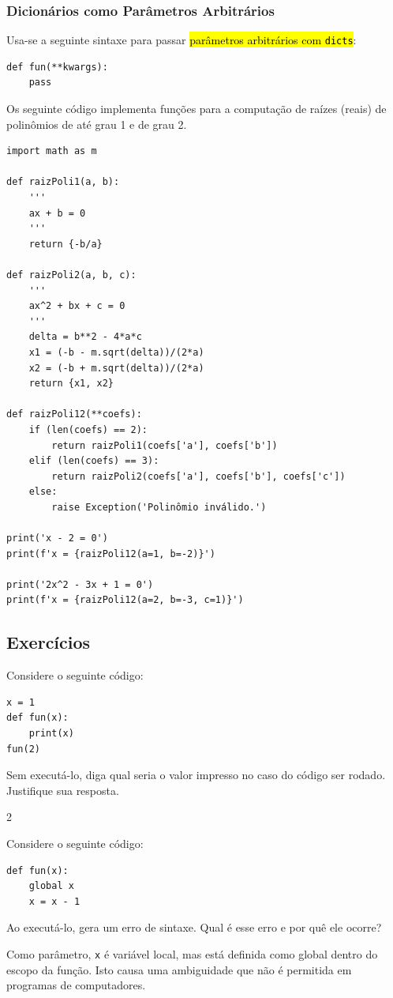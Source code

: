 \subsubsection{Dicionários como Parâmetros Arbitrários}

Usa-se a seguinte sintaxe para passar \hl{parâmetros arbitrários com {\lstinline+dicts+}}:
\begin{lstlisting}
def fun(**kwargs):
    pass
\end{lstlisting}


\begin{ex}
  Os seguinte código implementa funções para a computação de raízes (reais) de polinômios de até grau 1 e de grau 2.
\begin{lstlisting}
import math as m

def raizPoli1(a, b):
    '''
    ax + b = 0
    '''
    return {-b/a}

def raizPoli2(a, b, c):
    '''
    ax^2 + bx + c = 0
    '''
    delta = b**2 - 4*a*c
    x1 = (-b - m.sqrt(delta))/(2*a)
    x2 = (-b + m.sqrt(delta))/(2*a)
    return {x1, x2}

def raizPoli12(**coefs):
    if (len(coefs) == 2):
        return raizPoli1(coefs['a'], coefs['b'])
    elif (len(coefs) == 3):
        return raizPoli2(coefs['a'], coefs['b'], coefs['c'])
    else:
        raise Exception('Polinômio inválido.')

print('x - 2 = 0')
print(f'x = {raizPoli12(a=1, b=-2)}')

print('2x^2 - 3x + 1 = 0')
print(f'x = {raizPoli12(a=2, b=-3, c=1)}')
\end{lstlisting}
\end{ex}

\subsection{Exercícios}

\begin{exer}
  Considere o seguinte código:
\begin{lstlisting}
x = 1
def fun(x):
    print(x)
fun(2)
\end{lstlisting}
  Sem executá-lo, diga qual seria o valor impresso no caso do código ser rodado. Justifique sua resposta.
\end{exer}
\begin{resp}
  2
\end{resp}

\begin{exer}
  Considere o seguinte código:
\begin{lstlisting}
def fun(x):
    global x
    x = x - 1
\end{lstlisting}
  Ao executá-lo, {\python} gera um erro de sintaxe. Qual é esse erro e por quê ele ocorre?
\end{exer}
\begin{resp}
  Como parâmetro, \lstinline+x+ é variável local, mas está definida como global dentro do escopo da função. Isto causa uma ambiguidade que não é permitida em programas de computadores.
\end{resp}

